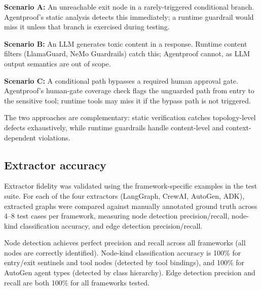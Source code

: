 \noindent
\textbf{Scenario A:} An unreachable exit node in a rarely-triggered
conditional branch. Agentproof's static analysis detects this immediately; a
runtime guardrail would miss it unless that branch is exercised during
testing.

\noindent
\textbf{Scenario B:} An LLM generates toxic content in a response.
Runtime content filters (LlamaGuard, NeMo Guardrails) catch this;
Agentproof cannot, as LLM output semantics are out of scope.

\noindent
\textbf{Scenario C:} A conditional path bypasses a required human
approval gate.  Agentproof's human-gate coverage check flags the
unguarded path from entry to the sensitive tool; runtime tools may miss
it if the bypass path is not triggered.

The two approaches are complementary: static verification catches
topology-level defects exhaustively, while runtime guardrails handle
content-level and context-dependent violations.

\subsection{Extractor accuracy}
\label{sec:accuracy}

Extractor fidelity was validated using the framework-specific examples
in the test suite. For each of the four extractors (LangGraph, CrewAI,
AutoGen, ADK), extracted graphs were compared against manually annotated
ground truth across 4--8 test cases per framework, measuring node
detection precision/recall, node-kind classification accuracy, and
edge detection precision/recall.

Node detection achieves perfect precision and recall across all
frameworks (all nodes are correctly identified). Node-kind
classification accuracy is 100\% for entry/exit sentinels and tool nodes
(detected by tool bindings), and 100\% for AutoGen agent types (detected
by class hierarchy). Edge detection precision and recall are both
100\% for all frameworks tested.

